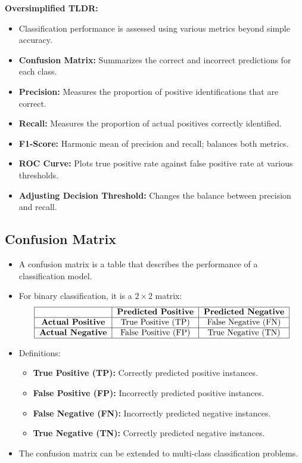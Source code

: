 \documentclass{article}
\begin{document}
\textbf{Oversimplified TLDR:}
\begin{itemize}
    \item Classification performance is assessed using various metrics beyond simple accuracy.
    \item \textbf{Confusion Matrix:} Summarizes the correct and incorrect predictions for each class.
    \item \textbf{Precision:} Measures the proportion of positive identifications that are correct.
    \item \textbf{Recall:} Measures the proportion of actual positives correctly identified.
    \item \textbf{F1-Score:} Harmonic mean of precision and recall; balances both metrics.
    \item \textbf{ROC Curve:} Plots true positive rate against false positive rate at various thresholds.
    \item \textbf{Adjusting Decision Threshold:} Changes the balance between precision and recall.
\end{itemize}

\subsection{Confusion Matrix}

\begin{itemize}
    \item A confusion matrix is a table that describes the performance of a classification model.
    \item For binary classification, it is a $2 \times 2$ matrix:
    \[
    \begin{tabular}{|c|c|c|}
    \hline
    & \textbf{Predicted Positive} & \textbf{Predicted Negative} \\
    \hline
    \textbf{Actual Positive} & \text{True Positive (TP)} & \text{False Negative (FN)} \\
    \hline
    \textbf{Actual Negative} & \text{False Positive (FP)} & \text{True Negative (TN)} \\
    \hline
    \end{tabular}
    \]
    \item Definitions:
    \begin{itemize}
        \item \textbf{True Positive (TP):} Correctly predicted positive instances.
        \item \textbf{False Positive (FP):} Incorrectly predicted positive instances.
        \item \textbf{False Negative (FN):} Incorrectly predicted negative instances.
        \item \textbf{True Negative (TN):} Correctly predicted negative instances.
    \end{itemize}
    \item The confusion matrix can be extended to multi-class classification problems.
\end{itemize}
\end{document}
